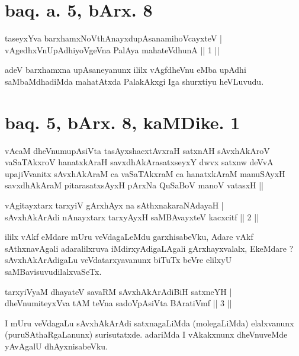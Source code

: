 \section*{baq. a. 5, bArx. 8}

\begin{shl}
taseyxYva barxhamxNoV\s thAnayxdupAsanamihoVcayxteV | \\
vAgedhxVnUpAdhiyoVgeVna PalAya mahateV\s dhunA \hfill ||  1 || 
\end{shl}

\begin{artha}
adeV barxhamxna upAsaneyanunx ililx vAgfdheVnu eMba upAdhi saMbaMdhadiMda mahatAtxda PalakAkxgi Iga shurxtiyu heVLuvudu.
\end{artha}

\section*{baq. 5, bArx. 8, kaMDike. 1}

\begin{shl}
vAcaM dheVnumupAsiVta tasAyxshacxtAvxraH satxnAH sAvxhAkAroV vaSaTAkxroV hanatxkAraH savxdhAkArasatxseyxY dwvx satxnw deVvA upajiVvanitx sAvxhAkAraM ca vaSaTAkxraM ca hanatxkAraM manuSAyxH savxdhAkAraM pitarasatxsAyxH pArxNa QuSaBoV manoV vatasxH ||
\end{shl}


\begin{shl}
vAgitayxtarx tarxyiV gArxhAyx na sAthxnakaraNAdayaH | \\
sAvxhAkArAdi nAnayxtarx tarxyAyxH saMBAvayxteV kacxcitf \hfill ||  2 || 
\end{shl}

\begin{artha}
ililx vAkf eMdare mUru veVdagaLeMdu garxhisabeVku, Adare vAkf sAthxnavAgali adaralilxruva iMdirxyAdigaLAgali gArxhayxvalalx, EkeMdare ? sAvxhAkArAdigaLu veVdatarxyavanunx biTuTx beVre elilxyU saMBavisuvudilalxvaSeTx.
\end{artha}

\begin{shl}
tarxyiVyaM dhayateV savaRM sAvxhAkArAdiBiH satxneYH | \\
dheVnumiteyxVva tAM teVna sadoVpAsiVta BAratiVmf \hfill ||  3 || 
\end{shl}

\begin{artha}
I mUru veVdagaLu sAvxhAkArAdi satxnagaLiMda (molegaLiMda) elalxvanunx (puruSAthaRgaLanunx) surisutatxde. adariMda I vAkakxnunx dheVnuveMde yAvAgalU dhAyxnisabeVku.
\end{artha}


